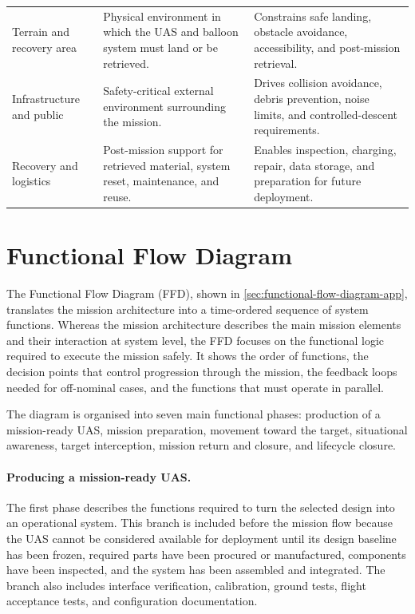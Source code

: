 \begin{longtable}{
    >{\raggedright\arraybackslash}p{}
    >{\raggedright\arraybackslash}p{}
    >{\raggedright\arraybackslash}p{}
}
\addlinespace

Terrain and recovery area &
Physical environment in which the UAS and balloon system must land or be retrieved. &
Constrains safe landing, obstacle avoidance, accessibility, and post-mission retrieval. \\

\addlinespace

Infrastructure and public &
Safety-critical external environment surrounding the mission. &
Drives collision avoidance, debris prevention, noise limits, and controlled-descent requirements. \\

\addlinespace

Recovery and logistics &
Post-mission support for retrieved material, system reset, maintenance, and reuse. &
Enables inspection, charging, repair, data storage, and preparation for future deployment. \\

\end{longtable}


\vspace{-25pt}
\section{Functional Flow Diagram}
\label{sec:functional_flow_diagram}

The Functional Flow Diagram (FFD), shown in \autoref{sec:functional-flow-diagram-app}, translates the mission architecture into a time-ordered sequence of system functions. Whereas the mission architecture describes the main mission elements and their interaction at system level, the FFD focuses on the functional logic required to execute the mission safely. It shows the order of functions, the decision points that control progression through the mission, the feedback loops needed for off-nominal cases, and the functions that must operate in parallel. 

The diagram is organised into seven main functional phases: production of a mission-ready UAS, mission preparation, movement toward the target, situational awareness, target interception, mission return and closure, and lifecycle closure. 
\vspace{-10pt}
\paragraph{Producing a mission-ready UAS.}
The first phase describes the functions required to turn the selected design into an operational system. This branch is included before the mission flow because the UAS cannot be considered available for deployment until its design baseline has been frozen, required parts have been procured or manufactured, components have been inspected, and the system has been assembled and integrated. The branch also includes interface verification, calibration, ground tests, flight acceptance tests, and configuration documentation. 
\vspace{-10pt}
